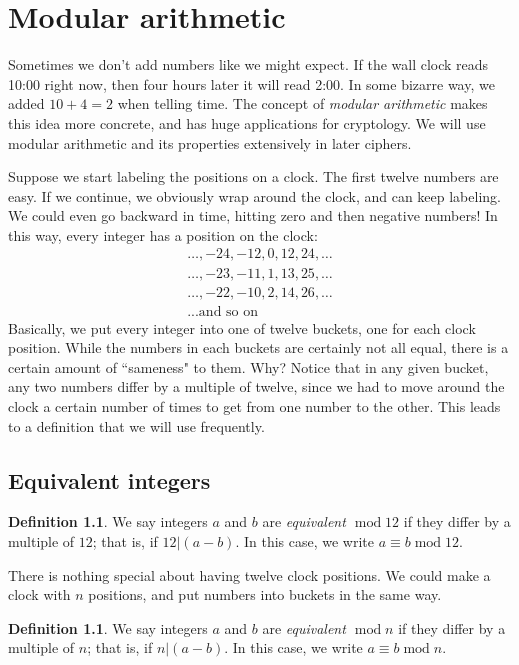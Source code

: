 \documentclass{book}
\theoremstyle{plain}
\theoremstyle{definition}
\newtheorem{definition}[theorem]{Definition}
\renewcommand{\mod}{\operatorname{mod}}
\renewcommand{\mod}{\operatorname{mod}}
\begin{document}
\chapter{Modular arithmetic}
Sometimes we don't add numbers like we might expect. If the wall clock reads 10:00 right now, then four hours later it will read 2:00. In some bizarre way, we added $10 + 4 = 2$ when telling time. The concept of {\it modular arithmetic} makes this idea more concrete, and has huge applications for cryptology. We will use modular arithmetic and its properties extensively in later ciphers.

Suppose we start labeling the positions on a clock. The first twelve numbers are easy. If we continue, we obviously wrap around the clock, and can keep labeling. We could even go backward in time, hitting zero and then negative numbers! In this way, every integer has a position on the clock:
\begin{eqnarray*}
\ldots, -24, -12, 0, 12, 24, \ldots \\
\ldots, -23, -11, 1, 13, 25, \ldots \\
\ldots, -22, -10, 2, 14, 26, \ldots \\
\text{...and so on}
\end{eqnarray*}
Basically, we put every integer into one of twelve buckets, one for each clock position. While the numbers in each buckets are certainly not all equal, there is a certain amount of ``sameness" to them. Why? Notice that in any given bucket, any two numbers differ by a multiple of twelve, since we had to move around the clock a certain number of times to get from one number to the other. This leads to a definition that we will use frequently.

\section{Equivalent integers}
\begin{definition}
We say integers $a$ and $b$ are {\it equivalent $\mod 12$} if they differ by a multiple of $12$; that is, if $12 | (a-b)$. In this case, we write $a \equiv b \mod 12$.
\end{definition}

There is nothing special about having twelve clock positions. We could make a clock with $n$ positions, and put numbers into buckets in the same way.

\begin{definition}
We say integers $a$ and $b$ are {\it equivalent $\mod n$} if they differ by a multiple of $n$; that is, if $n | (a-b)$. In this case, we write $a \equiv b \mod n$.
\end{definition}
\end{document}
